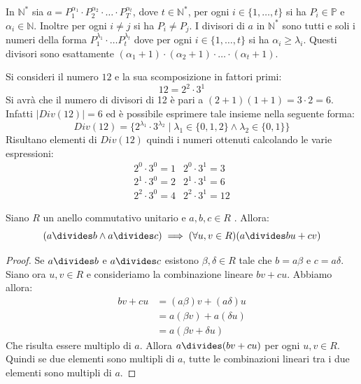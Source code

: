 \begin{propbox}
	In $\mathbb{N}^{*}$ sia $a=P_{1}^{\alpha_{1}}\cdot P_{2}^{\alpha_{2}} \cdot \ldots \cdot P_{T}^{\alpha_{t}}$, dove $t \in \mathbb{N}^{*}$, per ogni $i \in \{1,\ldots,t\}$ si ha $P_{i} \in \mathbb{P}$ e $\alpha_{i}\in \mathbb{N}$. Inoltre per ogni $i \neq j$ si ha $P_{i} \neq P_{j}$. I divisori di $a $ in $\mathbb{N}^{*}$ sono tutti e soli i numeri della forma $P_{1}^{\lambda_{1}}\cdot \ldots P_{t}^{\lambda_{t}}$ dove per ogni $i \in \{1,\ldots,t\}$ si ha $\alpha_{i} \geq \lambda_{i}$. Questi divisori sono esattamente $(\alpha_{1}+1)\cdot(\alpha_{2}+1)\cdot \ldots \cdot (\alpha_{t}+1)$.
\end{propbox}

\begin{example}
	Si consideri il numero $12$ e la sua scomposizione in fattori primi: $$12 = 2^{2}\cdot3^{1}$$
	Si avrà che il numero di divisori di 12 è pari a $(2+1)(1+1)=3 \cdot 2 = 6$. Infatti $|Div(12)|=6$ ed è possibile esprimere tale insieme nella seguente forma:
	\begin{displaymath}
		Div(12) = \{2^{\lambda_{1}}\cdot 3^{\lambda_{2}}\; | \; \lambda_{1} \in \{0,1,2\} \land \lambda_{2} \in \{0,1\}\}
	\end{displaymath}
	Risultano elementi di $Div(12)$ quindi i numeri ottenuti calcolando le varie espressioni:
	\begin{displaymath}
		\begin{array}{cc}
			2^{0}\cdot 3^{0}= 1 & 2^{0}\cdot3^{1}=3  \\
			2^{1}\cdot 3^{0}= 2 & 2^{1} \cdot 3^{1}=6 \\
			2^{2}\cdot 3^{0}=4 & 2^{2}\cdot 3^{1}=12
		\end{array}
	\end{displaymath}
\end{example}

\begin{lemmabox}
	Siano $R$ un anello commutativo unitario e $a,b,c \in R$ . Allora:
	\begin{equation}
		(a \divides b \land a \divides c) \implies (\forall u,v \in R)(a \divides bu+cv)
	\end{equation}
\end{lemmabox}

\begin{proof}
	Se $a \divides b$ e $a \divides c$ esistono $\beta,\delta \in R$ tale che $b = a\beta$  e $c= a \delta$. Siano ora $u,v \in R$ e consideriamo la combinazione lineare $bv+cu$. Abbiamo allora:
	\begin{align*}
		bv+cu &= (a \beta)v + (a \delta)u \\
		&= a (\beta v) +  a (\delta u)\\
		&= a (\beta v + \delta u)
	\end{align*}
	Che risulta essere multiplo di $a$. Allora $a \divides (bv+cu)$ per ogni $u,v \in R$. Quindi se due elementi sono multipli di $a$, tutte le combinazioni lineari tra i due elementi sono multipli di $a$.
\end{proof}

